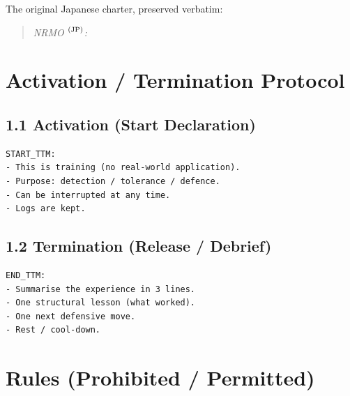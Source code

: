 The original Japanese charter, preserved verbatim:

\begin{quote}

\end{quote}

\begin{quote}
\textit{NRMO ${}^\textnormal{(JP)}$:} 
\end{quote}

\section{Activation / Termination Protocol}
\label{sec:ttm-protocol}

\subsection*{1.1 Activation (Start Declaration)}

\begin{lstlisting}[basicstyle=\ttfamily\small,frame=single]
START_TTM:
- This is training (no real-world application).
- Purpose: detection / tolerance / defence.
- Can be interrupted at any time.
- Logs are kept.
\end{lstlisting}

\subsection*{1.2 Termination (Release / Debrief)}

\begin{lstlisting}[basicstyle=\ttfamily\small,frame=single]
END_TTM:
- Summarise the experience in 3 lines.
- One structural lesson (what worked).
- One next defensive move.
- Rest / cool-down.
\end{lstlisting}

\section{Rules (Prohibited / Permitted)}
\label{sec:ttm-rules}


